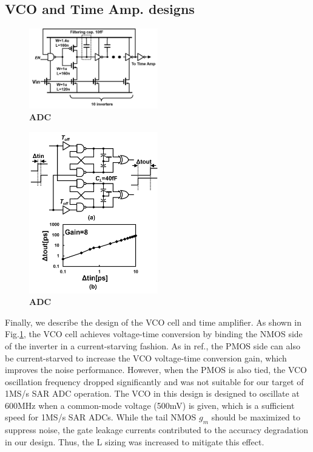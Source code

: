 \documentclass[letterpaper, 10 pt, conference]{ieeeconf}  %
\begin{document}
\subsection{VCO and Time Amp. designs}
\begin{figure}[ht!]
\centering
 \includegraphics[width=0.5\textwidth]{figs/vco_cell.png}
  \captionsetup{font=footnotesize}
  \caption{\textbf{ADC}}
  \label{cell}
\end{figure}

\begin{figure}[ht!]
\centering
 \includegraphics[width=0.5\textwidth]{figs/ta_chara.png}
  \captionsetup{font=footnotesize}
  \caption{\textbf{ADC}}
  \label{timeamp}
\end{figure}

Finally, we describe the design of the VCO cell and time amplifier. As shown in Fig.\ref{cell}, the VCO cell achieves voltage-time conversion by binding the NMOS side of the inverter in a current-starving fashion. As in ref.\cite{timecomp}, the PMOS side can also be current-starved to increase the VCO voltage-time conversion gain, which improves the noise performance. However, when the PMOS is also tied, the VCO oscillation frequency dropped significantly and was not suitable for our target of 1MS/s SAR ADC operation. The VCO in this design is designed to oscillate at 600MHz when a common-mode voltage (500mV) is given, which is a sufficient speed for 1MS/s SAR ADCs. While the tail NMOS $g_m$ should be maximized to suppress noise, the gate leakage currents contributed to the accuracy degradation in our design. Thus, the L sizing was increased to mitigate this effect. 
\end{document}
